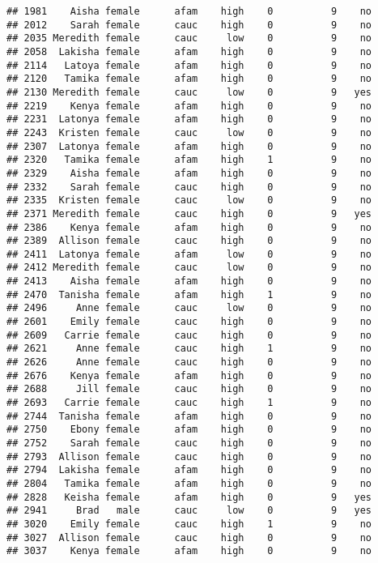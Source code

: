 \documentclass[
]{article}
\begin{document}
\begin{verbatim}
## 1981    Aisha female      afam    high    0          9    no
## 2012    Sarah female      cauc    high    0          9    no
## 2035 Meredith female      cauc     low    0          9    no
## 2058  Lakisha female      afam    high    0          9    no
## 2114   Latoya female      afam    high    0          9    no
## 2120   Tamika female      afam    high    0          9    no
## 2130 Meredith female      cauc     low    0          9   yes
## 2219    Kenya female      afam    high    0          9    no
## 2231  Latonya female      afam    high    0          9    no
## 2243  Kristen female      cauc     low    0          9    no
## 2307  Latonya female      afam    high    0          9    no
## 2320   Tamika female      afam    high    1          9    no
## 2329    Aisha female      afam    high    0          9    no
## 2332    Sarah female      cauc    high    0          9    no
## 2335  Kristen female      cauc     low    0          9    no
## 2371 Meredith female      cauc    high    0          9   yes
## 2386    Kenya female      afam    high    0          9    no
## 2389  Allison female      cauc    high    0          9    no
## 2411  Latonya female      afam     low    0          9    no
## 2412 Meredith female      cauc     low    0          9    no
## 2413    Aisha female      afam    high    0          9    no
## 2470  Tanisha female      afam    high    1          9    no
## 2496     Anne female      cauc     low    0          9    no
## 2601    Emily female      cauc    high    0          9    no
## 2609   Carrie female      cauc    high    0          9    no
## 2621     Anne female      cauc    high    1          9    no
## 2626     Anne female      cauc    high    0          9    no
## 2676    Kenya female      afam    high    0          9    no
## 2688     Jill female      cauc    high    0          9    no
## 2693   Carrie female      cauc    high    1          9    no
## 2744  Tanisha female      afam    high    0          9    no
## 2750    Ebony female      afam    high    0          9    no
## 2752    Sarah female      cauc    high    0          9    no
## 2793  Allison female      cauc    high    0          9    no
## 2794  Lakisha female      afam    high    0          9    no
## 2804   Tamika female      afam    high    0          9    no
## 2828   Keisha female      afam    high    0          9   yes
## 2941     Brad   male      cauc     low    0          9   yes
## 3020    Emily female      cauc    high    1          9    no
## 3027  Allison female      cauc    high    0          9    no
## 3037    Kenya female      afam    high    0          9    no

\end{verbatim}
\end{document}
